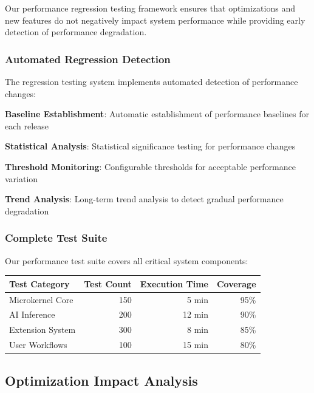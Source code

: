 Our performance regression testing framework ensures that optimizations and new features do not negatively impact system performance while providing early detection of performance degradation.

\subsubsection*{Automated Regression Detection}

The regression testing system implements automated detection of performance changes:

\begin{expandedlist}
    \item \textbf{Baseline Establishment}: Automatic establishment of performance baselines for each release
    \item \textbf{Statistical Analysis}: Statistical significance testing for performance changes
    \item \textbf{Threshold Monitoring}: Configurable thresholds for acceptable performance variation
    \item \textbf{Trend Analysis}: Long-term trend analysis to detect gradual performance degradation
\end{expandedlist}

\subsubsection*{Complete Test Suite}

Our performance test suite covers all critical system components:

\begin{center}
\begin{tabular}{@{}lrrr@{}}
\toprule
\textbf{Test Category} & \textbf{Test Count} & \textbf{Execution Time} & \textbf{Coverage} \\
\midrule
Microkernel Core & 150 & 5 min & 95\% \\
AI Inference & 200 & 12 min & 90\% \\
Extension System & 300 & 8 min & 85\% \\
User Workflows & 100 & 15 min & 80\% \\
\bottomrule
\end{tabular}
\end{center}

\subsection*{Optimization Impact Analysis}

